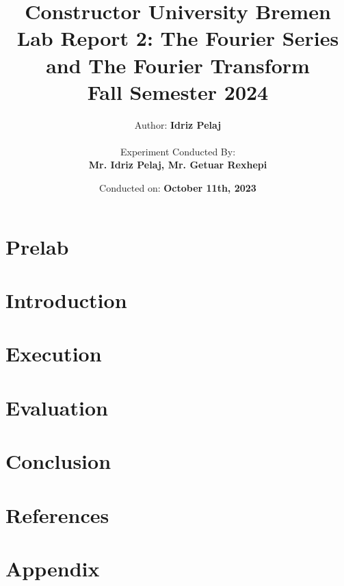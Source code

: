 \documentclass[12pt]{report}
\title{
    \textbf{Constructor University Bremen} \\
    \vspace{1cm}
    \textbf{Lab Report 2: The Fourier Series and The Fourier Transform} \\ 
    Fall Semester 2024 \\
}
\author{
    Author: \textbf{Idriz Pelaj} \\
    \vspace{1cm} \\
    Experiment Conducted By: \\ \textbf{Mr. Idriz Pelaj, Mr. Getuar Rexhepi}
}
\date{Conducted on: \textbf{October 11th, 2023}}
\begin{document}
\maketitle

\chapter{Prelab}
\vspace{-1cm}


\chapter{Introduction}
\vspace{-1cm}


\chapter{Execution}
\vspace{-1cm}


\chapter{Evaluation}
\vspace{-1cm}


\chapter{Conclusion}
\vspace{-1cm}


\chapter{References}
\vspace{-1cm}


\chapter{Appendix}
\vspace{-1cm}

\end{document}
